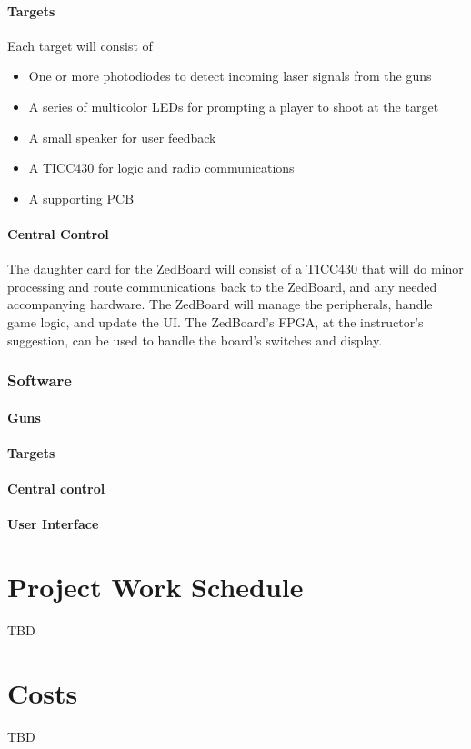 \documentclass{article}
\begin{document}
\paragraph{Targets}

Each target will consist of
\begin{itemize}
\item One or more photodiodes to detect incoming laser signals from the guns
\item A series of multicolor LEDs for prompting a player to shoot at the target
\item A small speaker for user feedback
\item A TICC430 for logic and radio communications
\item A supporting PCB
\end{itemize}

\paragraph{Central Control}

The daughter card for the ZedBoard will consist of a TICC430 that will do minor processing and route communications
back to the ZedBoard, and any needed accompanying hardware.
The ZedBoard will manage the peripherals, handle game logic, and update the UI.
The ZedBoard's FPGA, at the instructor's suggestion, can be used to handle the board's switches and display.

\subsubsection{Software}

\paragraph{Guns}

\paragraph{Targets}

\paragraph{Central control}

\paragraph{User Interface}

\section{Project Work Schedule}

TBD

\section{Costs}

TBD
\end{document}

